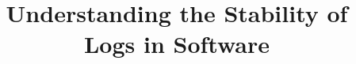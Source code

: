 %
%
%
%
%
%
%
\RequirePackage{fix-cm}
%
%
%
\documentclass[conference]{IEEEtran}

\usepackage{graphicx}
%
%
%
%
%


\title{Understanding the Stability of Logs in Software}



